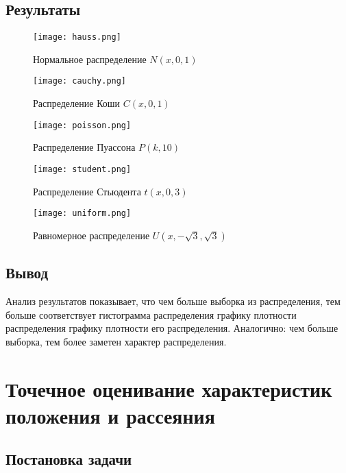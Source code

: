 \documentclass[14pt]{extarticle}
\begin{document}
\subsection{Результаты}

\begin{figure}[H]
    \centering
    \texttt{[image: hauss.png]}
    \caption{Нормальное распределение \(N(x, 0, 1)\)}
    \label{fig:enter-label}
\end{figure}

\begin{figure}[H]
    \centering
    \texttt{[image: cauchy.png]}
    \caption{Распределение Коши \(C(x, 0, 1)\)}
    \label{fig:enter-label}
\end{figure}

\begin{figure}[H]
    \centering
    \texttt{[image: poisson.png]}
    \caption{Распределение Пуассона \(P(k, 10)\)}
    \label{fig:enter-label}
\end{figure}

\begin{figure}[H]
    \centering
    \texttt{[image: student.png]}
    \caption{Распределение Стьюдента \(t(x, 0, 3)\)}
    \label{fig:enter-label}
\end{figure}

\begin{figure}[H]
    \centering
    \texttt{[image: uniform.png]}
    \caption{Равномерное распределение \(U (x, -\sqrt{3}, \sqrt{3})\)}
    \label{fig:enter-label}
\end{figure}

\subsection{Вывод}

Анализ результатов показывает, что чем больше выборка из распределения, тем больше соответствует гистограмма распределения графику плотности распределения графику плотности его распределения. Аналогично: чем больше выборка, тем более заметен характер распределения.

\section{Точечное оценивание характеристик положения и рассеяния}

\subsection{Постановка задачи}
\end{document}
